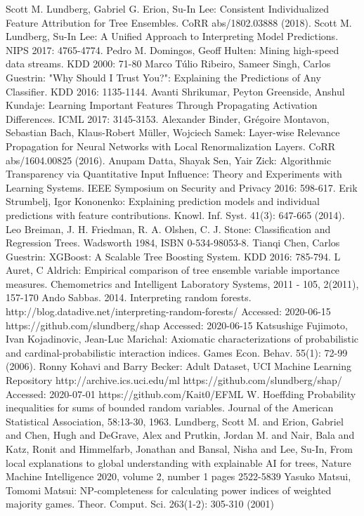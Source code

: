 \documentclass[conference]{IEEEtran}
\begin{document}
\begin{thebibliography}{00}
 Scott M. Lundberg, Gabriel G. Erion, Su-In Lee:
Consistent Individualized Feature Attribution for Tree Ensembles. CoRR abs/1802.03888 (2018).
 Scott M. Lundberg, Su-In Lee: A Unified Approach to Interpreting Model Predictions. NIPS 2017: 4765-4774.
 Pedro M. Domingos, Geoff Hulten: Mining high-speed data streams. KDD 2000: 71-80
 Marco Túlio Ribeiro, Sameer Singh, Carlos Guestrin: "Why Should I Trust You?": Explaining the Predictions of Any Classifier. KDD 2016: 1135-1144.
 Avanti Shrikumar, Peyton Greenside, Anshul Kundaje: Learning Important Features Through Propagating Activation Differences. ICML 2017: 3145-3153.
 Alexander Binder, Grégoire Montavon, Sebastian Bach, Klaus-Robert Müller, Wojciech Samek: Layer-wise Relevance Propagation for Neural Networks with Local Renormalization Layers. CoRR abs/1604.00825 (2016).
Anupam Datta, Shayak Sen, Yair Zick: Algorithmic Transparency via Quantitative Input Influence: Theory and Experiments with Learning Systems. IEEE Symposium on Security and Privacy 2016: 598-617.
Erik Strumbelj, Igor Kononenko: Explaining prediction models and individual predictions with feature contributions. Knowl. Inf. Syst. 41(3): 647-665 (2014).
 Leo Breiman, J. H. Friedman, R. A. Olshen, C. J. Stone: Classification and Regression Trees. Wadsworth 1984, ISBN 0-534-98053-8.
Tianqi Chen, Carlos Guestrin: XGBoost: A Scalable Tree Boosting System. KDD 2016: 785-794.
L Auret, C Aldrich: Empirical comparison of tree ensemble variable importance measures. Chemometrics and Intelligent Laboratory Systems, 2011 - 105, 2(2011), 157-170
Ando Sabbas. 2014. Interpreting random forests. http://blog.datadive.net/interpreting-random-forests/ Accessed: 2020-06-15
https://github.com/slundberg/shap Accessed: 2020-06-15
Katsushige Fujimoto, Ivan Kojadinovic, Jean-Luc Marichal: Axiomatic characterizations of probabilistic and cardinal-probabilistic interaction indices. Games Econ. Behav. 55(1): 72-99 (2006).
Ronny Kohavi and Barry Becker: Adult Dataset, UCI Machine Learning Repository http://archive.ics.uci.edu/ml
 https://github.com/slundberg/shap/ Accessed: 2020-07-01
 https://github.com/Kait0/EFML
 W. Hoeffding Probability inequalities for sums of bounded random variables. Journal of the American Statistical Association, 58:13-30, 1963.
 Lundberg, Scott M. and Erion, Gabriel and Chen, Hugh and DeGrave, Alex and Prutkin, Jordan M. and Nair, Bala and Katz, Ronit and Himmelfarb, Jonathan and Bansal, Nisha and Lee, Su-In, From local explanations to global understanding with explainable AI for trees, Nature Machine Intelligence 2020, volume 2, number 1 pages 2522-5839
 Yasuko Matsui, Tomomi Matsui: NP-completeness for calculating power indices of weighted majority games. Theor. Comput. Sci. 263(1-2): 305-310 (2001)


\end{thebibliography}
\end{document}
